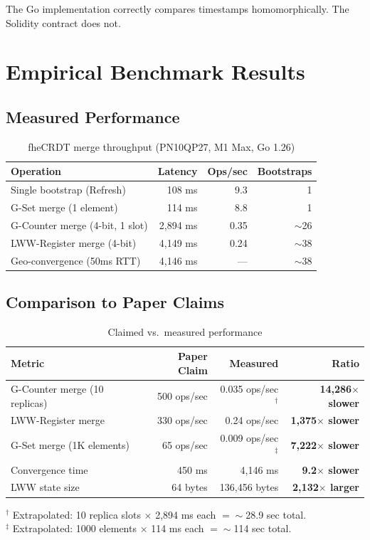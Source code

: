 \documentclass{fhe-shared/luxfhe}
\begin{document}
The Go implementation correctly compares timestamps homomorphically.
The Solidity contract does not.

\section{Empirical Benchmark Results}

\subsection{Measured Performance}

\begin{table}[h]
\centering
\caption{fheCRDT merge throughput (PN10QP27, M1 Max, Go 1.26)}
\label{tab:bench}
\begin{tabular}{lrrr}
\toprule
Operation & Latency & Ops/sec & Bootstraps \\
\midrule
Single bootstrap (Refresh)      & 108 ms  & 9.3     & 1 \\
G-Set merge (1 element)         & 114 ms  & 8.8     & 1 \\
G-Counter merge (4-bit, 1 slot) & 2,894 ms & 0.35   & $\sim$26 \\
LWW-Register merge (4-bit)      & 4,149 ms & 0.24   & $\sim$38 \\
Geo-convergence (50ms RTT)      & 4,146 ms & ---     & $\sim$38 \\
\bottomrule
\end{tabular}
\end{table}

\subsection{Comparison to Paper Claims}

\begin{table}[h]
\centering
\caption{Claimed vs.\ measured performance}
\label{tab:delta}
\begin{tabular}{lrrr}
\toprule
Metric & Paper Claim & Measured & Ratio \\
\midrule
G-Counter merge (10 replicas) & 500 ops/sec & 0.035 ops/sec$^\dagger$ & \textbf{14,286$\times$ slower} \\
LWW-Register merge            & 330 ops/sec & 0.24 ops/sec             & \textbf{1,375$\times$ slower} \\
G-Set merge (1K elements)     & 65 ops/sec  & 0.009 ops/sec$^\ddagger$ & \textbf{7,222$\times$ slower} \\
Convergence time              & 450 ms      & 4,146 ms                 & \textbf{9.2$\times$ slower} \\
LWW state size                & 64 bytes    & 136,456 bytes            & \textbf{2,132$\times$ larger} \\
\bottomrule
\end{tabular}

\footnotesize
$^\dagger$ Extrapolated: 10 replica slots $\times$ 2,894 ms each $= \sim$28.9 sec total.\\
$^\ddagger$ Extrapolated: 1000 elements $\times$ 114 ms each $= \sim$114 sec total.
\end{table}
\end{document}
